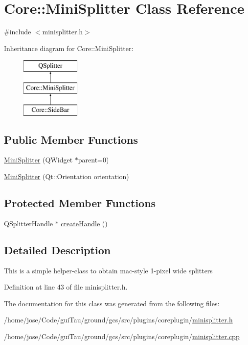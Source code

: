 \hypertarget{class_core_1_1_mini_splitter}{\section{Core\-:\-:Mini\-Splitter Class Reference}
\label{class_core_1_1_mini_splitter}
}


{\ttfamily \#include $<$minisplitter.\-h$>$}

Inheritance diagram for Core\-:\-:Mini\-Splitter\-:\begin{figure}[H]
\begin{center}
\leavevmode
\includegraphics[height=3.000000cm]{class_core_1_1_mini_splitter}
\end{center}
\end{figure}
\subsection*{Public Member Functions}
\begin{DoxyCompactItemize}
\item 
\hyperlink{group___core_plugin_ga0daa81d1f782306819ddd45944ba50cb}{Mini\-Splitter} (Q\-Widget $\ast$parent=0)
\item 
\hyperlink{group___core_plugin_ga75a5fe680b6339b267c9ca0c56f798b4}{Mini\-Splitter} (Qt\-::\-Orientation orientation)
\end{DoxyCompactItemize}
\subsection*{Protected Member Functions}
\begin{DoxyCompactItemize}
\item 
Q\-Splitter\-Handle $\ast$ \hyperlink{group___core_plugin_gad623d9fe534ec44acb1595afba592a44}{create\-Handle} ()
\end{DoxyCompactItemize}


\subsection{Detailed Description}
This is a simple helper-\/class to obtain mac-\/style 1-\/pixel wide splitters 

Definition at line 43 of file minisplitter.\-h.



The documentation for this class was generated from the following files\-:\begin{DoxyCompactItemize}
\item 
/home/jose/\-Code/gui\-Tau/ground/gcs/src/plugins/coreplugin/\hyperlink{minisplitter_8h}{minisplitter.\-h}\item 
/home/jose/\-Code/gui\-Tau/ground/gcs/src/plugins/coreplugin/\hyperlink{minisplitter_8cpp}{minisplitter.\-cpp}\end{DoxyCompactItemize}
